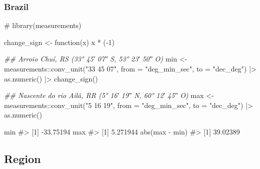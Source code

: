\documentclass[
  12pt,
  a4paper,
  oneside]{tesesusp}
\newenvironment{Shaded}{\begin{snugshade}}{\end{snugshade}}
\newcommand{\AttributeTok}[1]{\textcolor[rgb]{0.40,0.45,0.13}{#1}}
\newcommand{\CommentTok}[1]{\textcolor[rgb]{0.37,0.37,0.37}{#1}}
\newcommand{\ControlFlowTok}[1]{\textcolor[rgb]{0.00,0.23,0.31}{#1}}
\newcommand{\DecValTok}[1]{\textcolor[rgb]{0.68,0.00,0.00}{#1}}
\newcommand{\DocumentationTok}[1]{\textcolor[rgb]{0.37,0.37,0.37}{\textit{#1}}}
\newcommand{\FunctionTok}[1]{\textcolor[rgb]{0.28,0.35,0.67}{#1}}
\newcommand{\NormalTok}[1]{\textcolor[rgb]{0.00,0.23,0.31}{#1}}
\newcommand{\OtherTok}[1]{\textcolor[rgb]{0.00,0.23,0.31}{#1}}
\newcommand{\SpecialCharTok}[1]{\textcolor[rgb]{0.37,0.37,0.37}{#1}}
\newcommand{\StringTok}[1]{\textcolor[rgb]{0.13,0.47,0.30}{#1}}
\begin{document}
\hypertarget{brazil-1}{%
\subsubsection{Brazil}\label{brazil-1}}

\begin{Shaded}
\begin{Highlighting}[numbers=left,,]
\CommentTok{\# library(measurements)}

\NormalTok{change\_sign }\OtherTok{\textless{}{-}} \ControlFlowTok{function}\NormalTok{(x) x }\SpecialCharTok{*}\NormalTok{ (}\SpecialCharTok{{-}}\DecValTok{1}\NormalTok{)}

\DocumentationTok{\#\# Arroio Chuí, RS (33° 45′ 07″ S, 53° 23′ 50″ O)}
\NormalTok{min }\OtherTok{\textless{}{-}} 
\NormalTok{  measurements}\SpecialCharTok{::}\FunctionTok{conv\_unit}\NormalTok{(}\StringTok{"33 45 07"}\NormalTok{, }\AttributeTok{from =} \StringTok{"deg\_min\_sec"}\NormalTok{, }\AttributeTok{to =} \StringTok{"dec\_deg"}\NormalTok{) }\SpecialCharTok{|\textgreater{}}
  \FunctionTok{as.numeric}\NormalTok{() }\SpecialCharTok{|\textgreater{}}
  \FunctionTok{change\_sign}\NormalTok{()}

\DocumentationTok{\#\# Nascente do rio Ailã, RR (5° 16′ 19″ N, 60° 12′ 45″ O)}
\NormalTok{max }\OtherTok{\textless{}{-}} 
\NormalTok{  measurements}\SpecialCharTok{::}\FunctionTok{conv\_unit}\NormalTok{(}\StringTok{"5 16 19"}\NormalTok{, }\AttributeTok{from =} \StringTok{"deg\_min\_sec"}\NormalTok{, }\AttributeTok{to =} \StringTok{"dec\_deg"}\NormalTok{) }\SpecialCharTok{|\textgreater{}}
  \FunctionTok{as.numeric}\NormalTok{()}

\NormalTok{min}
\CommentTok{\#\textgreater{} [1] {-}33.75194}
\NormalTok{max}
\CommentTok{\#\textgreater{} [1] 5.271944}
\FunctionTok{abs}\NormalTok{(max }\SpecialCharTok{{-}}\NormalTok{ min)}
\CommentTok{\#\textgreater{} [1] 39.02389}
\end{Highlighting}
\end{Shaded}

\hypertarget{region}{%
\subsection{Region}\label{region}}
\end{document}
